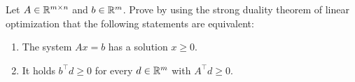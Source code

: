 \begin{problem}
    Let \(A \in \mathbb{R}^{m \times n}\) and \(b \in \mathbb{R}^m\). Prove by using the strong duality theorem of linear optimization that the following statements are equivalent:

    \begin{enumerate}
        \item The system \(A x = b\) has a solution \(x \ge 0\).
        \item It holds \(b^\top d \ge 0\) for every \(d \in \mathbb{R}^m\) with \(A^\top d \ge 0\).
    \end{enumerate}
\end{problem}

\begin{solution}
    
\end{solution}
